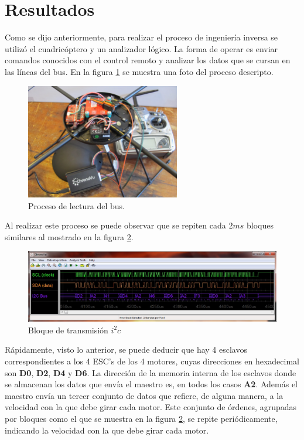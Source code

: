 \documentclass[spanish,12pt,a4paper,titlepage]{report}
\begin{document}
\newpage
\section{Resultados}

Como se dijo anteriormente, para realizar el proceso de ingeniería inversa se utilizó el cuadricóptero y un analizador lógico. La forma de operar es enviar comandos conocidos con el control remoto y analizar los datos que se cursan en las líneas del bus. En la figura \ref{fig:sniffing} se muestra una foto del proceso descripto.

\begin{figure}[h!]
	\centering
	\includegraphics[width=0.6\textwidth]{./pics/sniffing.jpg}
	\caption{Proceso de lectura del bus.}
	\label{fig:sniffing}
\end{figure}

Al realizar este proceso se puede observar que se repiten cada $2ms$ bloques similares al mostrado en la figura \ref{fig:bloque_snif}.

\begin{figure}[h!]
	\centering
	\includegraphics[width=1\textwidth]{./pics/bloque_snif.jpg}
	\caption{Bloque de transmisión $i^2c$}
	\label{fig:bloque_snif}
\end{figure}

Rápidamente, visto lo anterior, se puede deducir que hay 4 esclavos correspondientes a los 4 ESC's de los 4 motores, cuyas direcciones en hexadecimal son \textbf{D0}, \textbf{D2}, \textbf{D4} y \textbf{D6}. La dirección de la memoria interna de los esclavos donde se almacenan los datos que envía el maestro es, en todos los casos \textbf{A2}. Además el maestro envía un tercer conjunto de datos que refiere, de alguna manera, a la velocidad con la que debe girar cada motor.
Este conjunto de órdenes, agrupadas por bloques como el que se muestra en la figura \ref{fig:bloque_snif}, se repite periódicamente, indicando la velocidad con la que debe girar cada motor.\\
\end{document}
